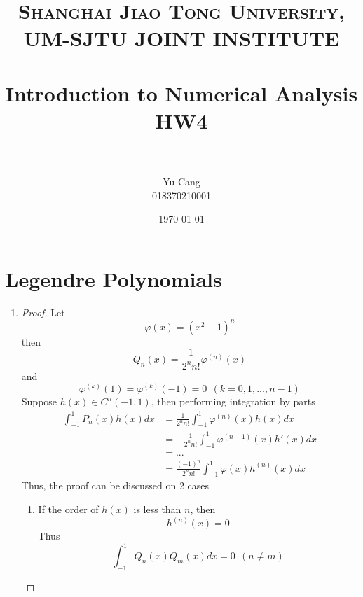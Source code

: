 \documentclass[paper=a4, fontsize=11pt]{scrartcl} %
\title{	
\normalfont \normalsize 
\textsc{Shanghai Jiao Tong University, UM-SJTU JOINT INSTITUTE} \\ [25pt] %
\horrule{0.5pt} \\[0.4cm] %
\huge Introduction to Numerical Analysis \\ HW4 \\ %
\horrule{2pt} \\[0.5cm] %
}
\author{Yu Cang \\ 018370210001} %
\date{\normalsize \today} %
\numberwithin{equation}{section} %
\numberwithin{figure}{section} %
\numberwithin{table}{section} %
\begin{document}
\maketitle %

\section{Legendre Polynomials}
	\begin{enumerate}
		\item
			\begin{proof}
				Let
				\begin{equation}
					\varphi(x) = (x^2-1)^n
				\end{equation}
				then
				\begin{equation}
					Q_n(x) = \frac{1}{2^n n!}\varphi^{(n)}(x)
				\end{equation}
				and
				\begin{equation}
					\varphi^{(k)}(1) = \varphi^{(k)}(-1) = 0 \ \  (\text{$k=0,1, ... , n-1$})
				\end{equation}
				Suppose $h(x) \in C^n(-1,1)$, then performing integration by parts
				\begin{equation}
					\begin{aligned}
						\int_{-1}^{1} P_n(x)h(x)dx 
						& = \frac{1}{2^n n!}\int_{-1}^{1}\varphi^{(n)}(x)h(x)dx \\
						& = -\frac{1}{2^n n!} \int_{-1}^{1}\varphi^{(n-1)}(x)h'(x)dx \\
						& = ...\\
						& = \frac{(-1)^n}{2^n n!}\int_{-1}^{1}\varphi(x)h^{(n)}(x)dx
					\end{aligned}
				\end{equation}
				Thus, the proof can be discussed on 2 cases
				
				\begin{enumerate}
					\item 
						If the order of $h(x)$ is less than $n$, then 
						\begin{equation}
							h^{(n)}(x) = 0
						\end{equation}
						Thus
						\begin{equation}
							\int_{-1}^{1}Q_n(x)Q_m(x)dx = 0 \ \ (\text{$n\neq m$})
						\end{equation}
											

\end{enumerate}
\end{proof}
\end{enumerate}
\end{document}

